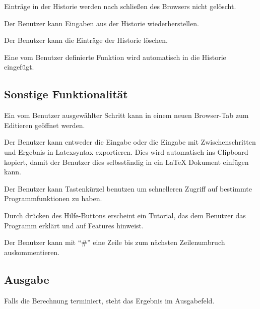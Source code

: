 \documentclass[parskip=full,11pt,twoside]{scrartcl}
\begin{document}
Einträge in der Historie werden nach schließen des Browsers nicht gelöscht.

Der Benutzer kann Eingaben aus der Historie wiederherstellen.

Der Benutzer kann die Einträge der Historie löschen.

Eine vom Benutzer definierte Funktion wird automatisch in die Historie eingefügt.




\subsection{Sonstige Funktionalität}

Ein vom Benutzer ausgewählter Schritt kann in einem neuen Browser-Tab zum Editieren geöffnet werden.

Der Benutzer kann entweder die Eingabe oder die Eingabe mit Zwischenschritten und Ergebnis in Latexsyntax exportieren. Dies wird automatisch ins Clipboard kopiert, damit der Benutzer dies selbsständig in ein LaTeX Dokument einfügen kann.

Der Benutzer kann Tastenkürzel benutzen um schnelleren Zugriff auf bestimmte Programmfunktionen zu haben.

Durch drücken des Hilfe-Buttons erscheint ein Tutorial, das dem Benutzer das Programm erklärt und auf Features hinweist.

Der Benutzer kann mit \enquote{\#} eine Zeile bis zum nächsten Zeilenumbruch auskommentieren.




\subsection{Ausgabe}

Falls die Berechnung terminiert, steht das Ergebnis im Ausgabefeld.
\end{document}
